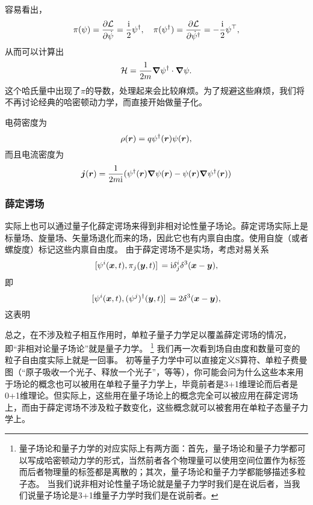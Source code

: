 \documentclass[hyperref, UTF8, a4paper]{ctexart}
\newcommand*{\ii}{\mathrm{i}}
\begin{document}
容易看出，
\[
    \pi(\psi) = \pdv{\mathcal{L}}{\dot{\psi}} = \frac{\ii}{2} \psi^\dagger, \quad \pi(\psi^\dagger) = \pdv{\mathcal{L}}{\dot{\psi}^\dagger} = - \frac{\ii}{2} \psi^\top,
\]
从而可以计算出
\begin{equation}
    \mathcal{H} = \frac{1}{2m} \grad{\psi^\dagger} \cdot \grad{\psi}.
\end{equation}
这个哈氏量中出现了$\pi$的导数，处理起来会比较麻烦。为了规避这些麻烦，我们将不再讨论经典的哈密顿动力学，而直接开始做量子化。

电荷密度为
\begin{equation}
    \rho(\vb*{r}) = q \psi^\dagger(\vb*{r}) \psi(\vb*{r}),
\end{equation}
而且电流密度为
\begin{equation}
    \vb*{j}(\vb*{r}) = \frac{1}{2m\ii} (\psi^\dagger(\vb*{r}) \grad{\psi}(\vb*{r}) - \psi(\vb*{r}) \grad{\psi}^\dagger(\vb*{r}))
\end{equation}

\subsubsection{薛定谔场}

实际上也可以通过量子化薛定谔场来得到非相对论性量子场论。薛定谔场实际上是标量场、旋量场、矢量场退化而来的场，因此它也有内禀自由度。使用自旋（或者螺旋度）标记这些内禀自由度。
由于薛定谔场不是实场，考虑对易关系
\[
    \comm*{{\psi}^i(\vb*{x}, t)}{{\pi}_j(\vb*{y}, t)} = \ii \delta^i_j \delta^3 (\vb*{x} - \vb*{y}),
\]
即
\[
    \comm*{{\psi}^i(\vb*{x}, t)}{({\psi}^j)^\dagger (\vb*{y}, t)} = 2 \delta^3 (\vb*{x} - \vb*{y}),
\]
这表明

总之，在不涉及粒子相互作用时，单粒子量子力学足以覆盖薛定谔场的情况，即“非相对论量子场论”就是量子力学。%
\footnote{
    量子场论和量子力学的对应实际上有两方面：首先，量子场论和量子力学都可以写成哈密顿动力学的形式，当然前者各个物理量可以使用空间位置作为标签而后者物理量的标签都是离散的；其次，量子场论和量子力学都能够描述多粒子态。
    当我们说非相对论性量子场论就是量子力学时我们是在说后者，当我们说量子场论是3+1维量子力学时我们是在说前者。
}%
我们再一次看到场自由度和数量可变的粒子自由度实际上就是一回事。
初等量子力学中可以直接定义S算符、单粒子费曼图（“原子吸收一个光子、释放一个光子”，等等），你可能会问为什么这些本来用于场论的概念也可以被用在单粒子量子力学上，毕竟前者是3+1维理论而后者是0+1维理论。但实际上，这些用在量子场论上的概念完全可以被应用在薛定谔场上，而由于薛定谔场不涉及粒子数变化，这些概念就可以被套用在单粒子态量子力学上。
\end{document}
